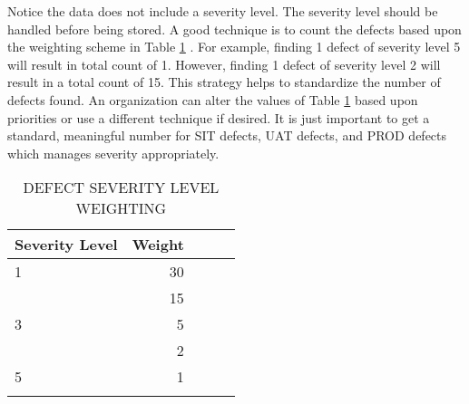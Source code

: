 \documentclass[SDSUThesis.tex]{subfiles}
\begin{document}
                Notice the data does not include a severity level.  The severity
                level should be handled before being stored.  A good technique is
                to count the defects based upon the weighting scheme
                in Table \ref{tab:severityweight} \cite{Raynus1999}. For
                example, finding 1 defect of severity level 5 will result
                in total count of 1.  However, finding 1 defect of severity
                level 2 will result in a total count of 15. This strategy helps
                to standardize the number of defects found.  An organization
                can alter the values of Table \ref{tab:severityweight} based 
                upon priorities or use a different technique if desired.  It
                is just important to get a standard, meaningful number for SIT defects,
                UAT defects, and PROD defects which manages severity appropriately.
                
                \begin{longtable}{@{}l rr rr}
                    
                    \toprule%
                     \centering%
                     {\bfseries Severity Level}
                     & {\bfseries Weight} \\
                    
                    \cmidrule[0.4pt](r{0.125em}){1-1}%
                    \cmidrule[0.4pt](lr{0.125em}){2-2}%
                    \endhead
                    
                    1 & 30 \\
                    \myrowcolour%
                    2 &  15 \\
                    3 &  5 \\
                    \myrowcolour%
                    4 &  2 \\ 
                    5 &  1 \\ 
                    
                    \bottomrule
                    
                    \caption{DEFECT SEVERITY LEVEL WEIGHTING}
                    \label{tab:severityweight}
                \end{longtable}
            
\end{document}

